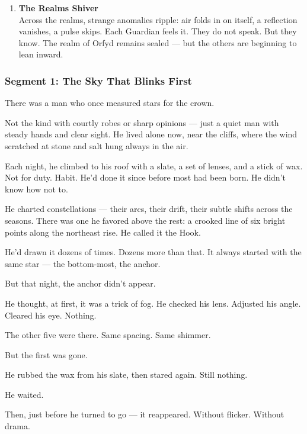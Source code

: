 \documentclass[9pt]{article}
\begin{document}
\begin{enumerate}
    \vspace{1em}
    \item \textbf{The Realms Shiver} \\
    Across the realms, strange anomalies ripple: air folds in on itself, a reflection vanishes, a pulse skips. Each Guardian feels it. They do not speak. But they know. The realm of Orfyd remains sealed — but the others are beginning to lean inward.

\end{enumerate}





\newpage

\subsubsection*{Segment 1: The Sky That Blinks First}

There was a man who once measured stars for the crown.

Not the kind with courtly robes or sharp opinions — just a quiet man with steady hands and clear sight. He lived alone now, near the cliffs, where the wind scratched at stone and salt hung always in the air.

Each night, he climbed to his roof with a slate, a set of lenses, and a stick of wax. Not for duty. Habit. He’d done it since before most had been born. He didn’t know how not to.

He charted constellations — their arcs, their drift, their subtle shifts across the seasons. There was one he favored above the rest: a crooked line of six bright points along the northeast rise. He called it the Hook.

He’d drawn it dozens of times. Dozens more than that. It always started with the same star — the bottom-most, the anchor.

But that night, the anchor didn’t appear.

He thought, at first, it was a trick of fog. He checked his lens. Adjusted his angle. Cleared his eye. Nothing.

The other five were there. Same spacing. Same shimmer.

But the first was gone.

He rubbed the wax from his slate, then stared again. Still nothing.

He waited.

Then, just before he turned to go — it reappeared. Without flicker. Without drama.
\end{document}
